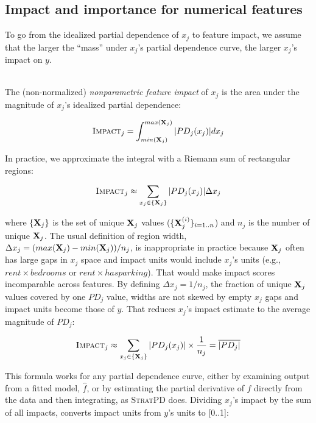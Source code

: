 \documentclass[11pt]{article}
\newcommand{\Imp}{\fontfamily{cmr}\textsc{Impact}}
\newcommand{\spd}{\fontfamily{cmr}\textsc{\small StratPD}}
\begin{document}
\subsection{Impact and importance for numerical features}

To go from the idealized partial dependence of $x_j$ to feature impact, we assume that the larger the ``mass'' under $x_j$'s partial dependence curve, the larger $x_j$'s impact on $y$.

~\\
 The (non-normalized) {\em nonparametric feature impact} of $x_j$ is the area under the magnitude of $x_j$'s idealized partial dependence:

\begin{equation}
\Imp_j = \int_{min({\bf X}_j)}^{max({\bf X}_j)} |PD_j(x_j)| dx_j
\end{equation}

\noindent In practice, we approximate the integral with a Riemann sum of rectangular regions:

\begin{equation}
\Imp_j \approx \sum_{x_j \in \{{\bf X}_j\}} |PD_j(x_j)| \Delta x_j
\end{equation}

\noindent  where $\{{\bf X}_j\}$ is the set of unique ${\bf X}_j$ values ($\{{\bf X}_j^{(i)}\}_{i=1..n}$) and $n_j$ is the number of unique ${\bf X}_j$. 
The usual definition of region width, $\Delta x_j = {(max({\bf X}_j) - min({\bf X}_j))}/{n_j}$, is inappropriate in practice because ${\bf X}_j$ often has large gaps in $x_j$ space and impact units would include $x_j$'s units (e.g., $rent \times bedrooms$ or $rent \times hasparking$). That would make impact scores incomparable across features. By defining $\Delta x_j = 1/n_j$, the fraction of unique ${\bf X}_j$ values covered by one $PD_j$ value, widths are not skewed by empty $x_j$ gaps and impact units become those of $y$. That reduces $x_j$'s impact estimate to the average magnitude of $PD_j$:

\[
\Imp_j \approx  \sum_{x_j \in \{{\bf X}_j\}} |PD_j(x_j)| \times \frac{1}{n_j} = \overline{|PD_j|}
\]

\noindent This formula works for any partial dependence curve, either by examining output from a fitted model, $\hat{f}$, or by estimating the partial derivative of $f$ directly from the data and then integrating, as \spd{} does. Dividing $x_j$'s impact by the sum of all impacts, converts impact units from $y$'s units to [0..1]:
\end{document}
